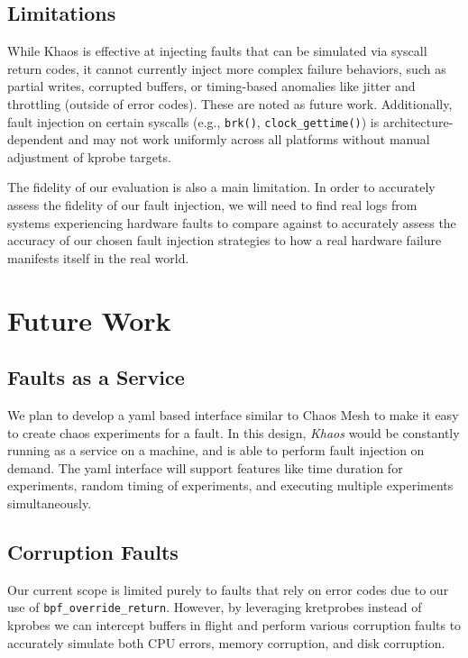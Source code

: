 \subsection{Limitations}

While Khaos is effective at injecting faults that can be simulated via syscall return codes, it cannot currently inject more complex failure behaviors, such as partial writes, corrupted buffers, or timing-based anomalies like jitter and throttling (outside of error codes). These are noted as future work. Additionally, fault injection on certain syscalls (e.g., \texttt{brk()}, \texttt{clock\_gettime()}) is architecture-dependent and may not work uniformly across all platforms without manual adjustment of kprobe targets.

The fidelity of our evaluation is also a main limitation. In order to accurately assess the fidelity of our fault injection, we will need to find real logs from systems experiencing hardware faults to compare against to accurately assess the accuracy of our chosen fault injection strategies to how a real hardware failure manifests itself in the real world.

\section{Future Work}

\subsection{Faults as a Service}
We plan to develop a yaml based interface similar to Chaos Mesh \cite{chaosmesh2023} to make it easy to create chaos experiments for a fault. In this design, \textit{Khaos} would be constantly running as a service on a machine, and is able to perform fault injection on demand. The yaml interface will support features like time duration for experiments, random timing of experiments, and executing multiple experiments simultaneously.

\subsection{Corruption Faults}
Our current scope is limited purely to faults that rely on error codes due to our use of \texttt{bpf\_override\_return}. However, by leveraging kretprobes instead of kprobes we can intercept buffers in flight and perform various corruption faults to accurately simulate both CPU errors, memory corruption, and disk corruption.

